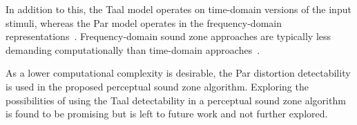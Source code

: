 In addition to this, the Taal model operates on time-domain versions of the input stimuli, 
whereas the Par model operates in the frequency-domain representations~\cite{van2005perceptual, taal2012low}.
Frequency-domain sound zone approaches are typically less demanding computationally than 
time-domain approaches~\cite{vindrola2019personal}.

As a lower computational complexity is desirable, the Par distortion detectability 
is used in the proposed perceptual sound zone algorithm.
Exploring the possibilities of using the Taal detectability in a perceptual sound zone algorithm
is found to be promising but is left to future work and not further explored.

